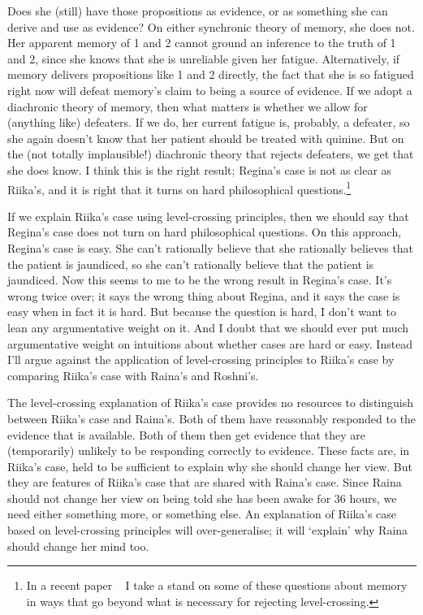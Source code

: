 Does she (still) have those propositions as evidence, or as something she can derive and use as evidence? On either synchronic theory of memory, she does not. Her apparent memory of 1 and 2 cannot ground an inference to the truth of 1 and 2, since she knows that she is unreliable given her fatigue. Alternatively, if memory delivers propositions like 1 and 2 directly, the fact that she is so fatigued right now will defeat memory's claim to being a source of evidence. If we adopt a diachronic theory of memory, then what matters is whether we allow for (anything like) defeaters. If we do, her current fatigue is, probably, a defeater, so she again doesn't know that her patient should be treated with quinine. But on the (not totally implausible!) diachronic theory that rejects defeaters, we get that she does know. I think this is the right result; \gls{Regina}'s case is not as clear as \gls{Riika}'s, and it is right that it turns on hard philosophical questions.\footnote{In a recent paper ~\citep{Weatherson2015} I take a stand on some of these questions about memory in ways that go beyond what is necessary for rejecting level-crossing.}

If we explain \gls{Riika}'s case using level-crossing principles, then we should say that \gls{Regina}'s case does not turn on hard philosophical questions. On this approach, \gls{Regina}'s case is easy. She can't rationally believe that she rationally believes that the patient is jaundiced, so she can't rationally believe that the patient is jaundiced. Now this seems to me to be the wrong result in \gls{Regina}'s case. It's wrong twice over; it says the wrong thing about \gls{Regina}, and it says the case is easy when in fact it is hard. But because the question is hard, I don't want to lean any argumentative weight on it. And I doubt that we should ever put much argumentative weight on intuitions about whether cases are hard or easy. Instead I'll argue against the application of level-crossing principles to \gls{Riika}'s case by comparing \gls{Riika}'s case with Raina's and \gls{Roshni}'s.

The level-crossing explanation of \gls{Riika}'s case provides no resources to distinguish between \gls{Riika}'s case and Raina's. Both of them have reasonably responded to the evidence that is available. Both of them then get evidence that they are (temporarily) unlikely to be responding correctly to evidence. These facts are, in \gls{Riika}'s case, held to be sufficient to explain why she should change her view. But they are features of \gls{Riika}'s case that are shared with Raina's case. Since Raina should not change her view on being told she has been awake for 36 hours, we need either something more, or something else. An explanation of \gls{Riika}'s case based on level-crossing principles will over-generalise; it will `explain' why Raina should change her mind too.

